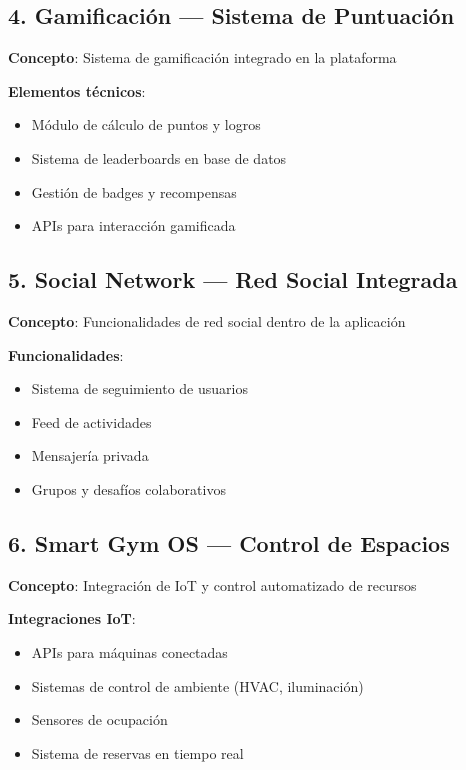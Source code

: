\documentclass[11pt,a4paper]{article}
\begin{document}
\begin{itemize}
\subsection{4. Gamificación — Sistema de Puntuación}

\begin{definicion}
\textbf{Concepto}: Sistema de gamificación integrado en la plataforma
\end{definicion}

\textbf{Elementos técnicos}:
\begin{itemize}
    \item Módulo de cálculo de puntos y logros
    \item Sistema de leaderboards en base de datos
    \item Gestión de badges y recompensas
    \item APIs para interacción gamificada
\end{itemize}

\subsection{5. Social Network — Red Social Integrada}

\begin{definicion}
\textbf{Concepto}: Funcionalidades de red social dentro de la aplicación
\end{definicion}

\textbf{Funcionalidades}:
\begin{itemize}
    \item Sistema de seguimiento de usuarios
    \item Feed de actividades
    \item Mensajería privada
    \item Grupos y desafíos colaborativos
\end{itemize}

\subsection{6. Smart Gym OS — Control de Espacios}

\begin{definicion}
\textbf{Concepto}: Integración de IoT y control automatizado de recursos
\end{definicion}

\textbf{Integraciones IoT}:
\begin{itemize}
    \item APIs para máquinas conectadas
    \item Sistemas de control de ambiente (HVAC, iluminación)
    \item Sensores de ocupación
    \item Sistema de reservas en tiempo real
\end{itemize}


\end{itemize}
\end{document}
